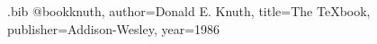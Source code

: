 \begin{filecontents*}[overwrite]{\jobname.bib}
@book{knuth, author={Donald E. Knuth}, title={The {\TeX}book}, publisher={Addison-Wesley}, year={1986}}
\end{filecontents*}
\documentclass{article}
\usepackage[round]{natbib}

See \citet{knuth}.



